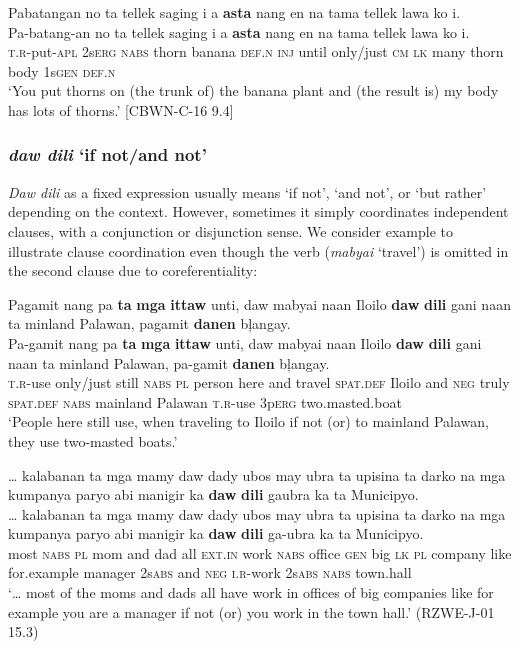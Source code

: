 \ea
Pabatangan no ta tellek saging i a \textbf{asta} nang en na tama tellek lawa ko i. \\
\vspace{4pt} \gll Pa-batang-an no ta tellek saging i a \textbf{asta} nang en na tama tellek lawa ko i. \\
\textsc{t.r}-put-\textsc{apl} 2s\textsc{erg} \textsc{nabs} thorn banana \textsc{def.n} \textsc{inj} until only/just \textsc{cm} \textsc{lk} many thorn body 1s\textsc{gen} \textsc{def.n} \\
\glt ‘You put thorns on (the trunk of) the banana plant and (the result is) my body has lots of thorns.’ [CBWN-C-16 9.4]
\z

\subsubsection{\textit{daw dili} `if not/and not'}
\label{sec:dawdili}
\textit{Daw dili} as a fixed expression usually means ‘if not’, ‘and not’, or ‘but rather’ depending on the context. However, sometimes it simply coordinates independent clauses, with a conjunction or disjunction sense. We consider example  to illustrate clause coordination even though the verb (\textit{mabyai} ‘travel’) is omitted in the second clause due to coreferentiality:

\ea
\label{ex:usetwomastedboats}
Pagamit nang pa \textbf{ta} \textbf{mga} \textbf{ittaw} unti, daw mabyai naan Iloilo \textbf{daw} \textbf{dili} gani naan ta minland Palawan, pagamit \textbf{danen} b\c{l}angay. \\
\vspace{4pt} \gll Pa-gamit nang pa \textbf{ta} \textbf{mga} \textbf{ittaw} unti, daw mabyai naan Iloilo \textbf{daw} \textbf{dili} gani naan ta minland Palawan, pa-gamit \textbf{danen} b\c{l}angay. \\
\textsc{t.r}-use only/just still \textsc{nabs} \textsc{pl} person here and travel \textsc{spat.def} Iloilo and \textsc{neg} truly \textsc{spat.def} \textsc{nabs} mainland Palawan \textsc{t.r}-use 3p\textsc{erg} two.masted.boat \\
\glt ‘People here still use, when traveling to Iloilo if not (or) to mainland Palawan, they use two-masted boats.’ 
\z

\ea
… kalabanan ta mga mamy daw dady ubos may ubra ta upisina ta darko na mga kumpanya paryo abi manigir ka \textbf{daw} \textbf{dili} gaubra ka ta Municipyo. \\
\vspace{4pt} \gll … kalabanan ta mga mamy daw dady ubos may ubra ta upisina ta darko na mga kumpanya paryo abi manigir ka \textbf{daw} \textbf{dili} ga-ubra ka ta Municipyo. \\
{} most \textsc{nabs} \textsc{pl} mom and dad all \textsc{ext.in} work \textsc{nabs} office \textsc{gen} big \textsc{lk} \textsc{pl} company like for.example manager 2s\textsc{abs} and \textsc{neg} \textsc{i.r}-work 2s\textsc{abs} \textsc{nabs} town.hall \\
\glt ‘… most of the moms and dads all have work in offices of big companies like for example you are a manager if not (or) you work in the town hall.’ (RZWE-J-01 15.3)
\z

